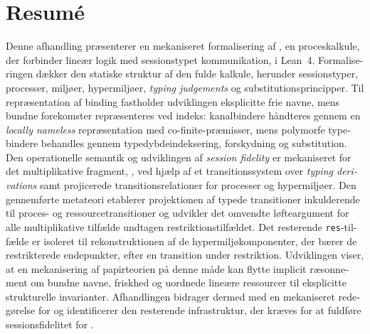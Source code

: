 \documentclass[
    final,
    highlight, %
    british, %
    a4paper, %
    acmsmall, %
    acmthm, %
    natbib, %
    screen, %
    review, %
    nonacm, %
]{acmart}
\begin{document}
\section*{Resumé}
\begin{otherlanguage}{danish}
Denne afhandling præsenterer en mekaniseret formalisering af \pill{}, en proceskalkule, der forbinder lineær logik med sessionstypet kommunikation, i Lean~4. Formaliseringen dækker den statiske struktur af den fulde kalkule, herunder sessionstyper, processer, miljøer, hypermiljøer, \emph{typing judgements} og substitutionsprincipper. Til repræsentation af binding fastholder udviklingen eksplicitte frie navne, mens bundne forekomster repræsenteres ved indeks: kanalbindere håndteres gennem en \emph{locally nameless} repræsentation med co-finite-præmisser, mens polymorfe typebindere behandles gennem typedybdeindeksering, forskydning og substitution. Den operationelle semantik og udviklingen af \emph{session fidelity} er mekaniseret for det multiplikative fragment, \pimll{}, ved hjælp af et transitionssystem over \emph{typing derivations} samt projicerede transitionsrelationer for processer og hypermiljøer. Den gennemførte metateori etablerer projektionen af typede transitioner inkulderende til proces- og ressourcetransitioner og udvikler det omvendte løfteargument for alle multiplikative tilfælde undtagen  restriktionstilfældet. Det resterende \texttt{res}-tilfælde er isoleret til rekonstruktionen af de hypermiljøkomponenter, der bærer de restrikterede endepunkter, efter en transition under restriktion. Udviklingen viser, at en mekanisering af papirteorien på denne måde kan flytte implicit ræsonnement om bundne navne, friskhed og uordnede lineære ressourcer til eksplicitte strukturelle invarianter. Afhandlingen bidrager dermed med en mekaniseret redegørelse for \pill{} og identificerer den resterende infrastruktur, der kræves for at fuldføre sessionsfidelitet for \pimll{}.
\end{otherlanguage}
\clearpage

\begingroup
\renewcommand{\addcontentsline}[3]{}
\tableofcontents
\endgroup

\clearpage










% 
\end{document}
